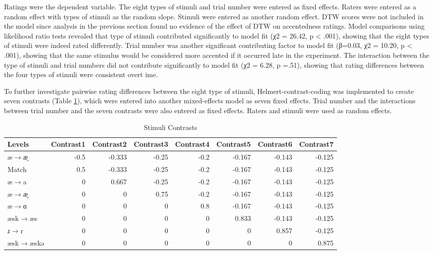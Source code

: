 Ratings were the dependent variable. The eight types of stimuli and trial number were entered as fixed effects. Raters were entered as a random effect with types of stimuli as the random slope. Stimuli were entered as another random effect. DTW scores were not included in the model since analysis in the previous section found no evidence of the effect of DTW on accentedness ratings. Model comparisons using likelihood ratio tests revealed that type of stimuli contributed significantly to model fit (χ2 = 26.42, p < .001), showing that the eight types of stimuli were indeed rated differently. Trial number was another significant contributing factor to model fit (β=0.03, χ2 = 10.20, p < .001), showing that the same stimulus would be considered more accented if it occurred late in the experiment. The interaction between the type of stimuli and trial numbers did not contribute significantly to model fit (χ2 = 6.28, p =.51), showing that rating differences between the four types of stimuli were consistent overt ime. 

To further investigate pairwise rating differences between the eight type of stimuli, Helmert-contrast-coding was implemented to create seven contrasts (Table \ref{table:contr2}), which were entered into another mixed-effects model as seven fixed effects. Trial number and the interactions between trial number and the seven contrasts were also entered as fixed effects. Raters and stimuli were used as random effects. 

\begin{table}[!h]
  \figSpace
\centering
  \caption{Stimuli Contrasts}
  \label{table:contr2}%
\begin{tabular}{lrrrrrrr}
	\toprule
  Levels & Contrast1 & Contrast2 & Contrast3 & Contrast4 & Contrast5 & Contrast6 & Contrast7 \\
    \midrule
    æ$\rightarrow$æ̞    & -0.5  & -0.333 & -0.25 & -0.2  & -0.167 & -0.143 & -0.125 \\
    Match     & 0.5   & -0.333 & -0.25 & -0.2  & -0.167 & -0.143 & -0.125 \\
    æ$\rightarrow$a     & 0     & 0.667 & -0.25 & -0.2  & -0.167 & -0.143 & -0.125 \\
    æ$\rightarrow$æ̝     & 0     & 0     & 0.75  & -0.2  & -0.167 & -0.143 & -0.125 \\
    æ$\rightarrow$ɑ     & 0     & 0     & 0     & 0.8   & -0.167 & -0.143 & -0.125 \\
    æsk$\rightarrow$æs     & 0     & 0     & 0     & 0     & 0.833 & -0.143 & -0.125 \\
    ɹ$\rightarrow$r     & 0     & 0     & 0     & 0     & 0     & 0.857 & -0.125 \\
    æsk$\rightarrow$æskə    & 0     & 0     & 0     & 0     & 0     & 0     & 0.875 \\
    \bottomrule     
\end{tabular}
  \figSpace
\end{table}

